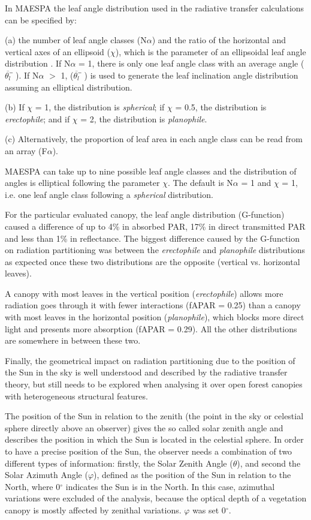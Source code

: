 \documentclass[a4paper,11pt]{report}
\begin{document}
In MAESPA the leaf angle distribution used in the radiative transfer calculations can be specified by:

(a) the number of leaf angle classes (N$\alpha$) and the ratio of the horizontal and vertical axes of an ellipsoid ($\chi$), which is the parameter of an ellipsoidal leaf angle distribution \citep{Campbell1990}. If N$\alpha$ = 1, there is only one leaf angle class with an average angle ($\overline{\theta_l}̅$). If N$\alpha$ $>$ 1, ($\overline{\theta_l}̅$) is used to generate the leaf inclination angle distribution assuming an elliptical distribution.

(b) If $\chi$ = 1, the distribution is \textit{spherical}; if $\chi$ = 0.5, the distribution is \textit{erectophile}; and if $\chi$ = 2, the distribution is \textit{planophile}. 

(c) Alternatively, the proportion of leaf area in each angle class can be read from an array (F$\alpha$). 

MAESPA can take up to nine possible leaf angle classes and the distribution of angles is elliptical following the parameter $\chi$. The default is N$\alpha$ = 1 and $\chi$ = 1, i.e. one leaf angle class following a \textit{spherical} distribution. 

For the particular evaluated canopy, the leaf angle distribution (G-function) caused a difference of up to 4\% in absorbed PAR, 17\% in direct transmitted PAR and less than 1\% in reflectance. The biggest difference caused by the G-function on radiation partitioning was between the \textit{erectophile} and \textit{planophile} distributions as expected once these two distributions are the opposite (vertical vs. horizontal leaves). 

A canopy with most leaves in the vertical position (\textit{erectophile}) allows more radiation goes through it with fewer interactions (fAPAR = 0.25) than a canopy with most leaves in the horizontal position (\textit{planophile}), which blocks more direct light and presents more absorption (fAPAR = 0.29). All the other distributions are somewhere in between these two. 

Finally, the geometrical impact on radiation partitioning due to the position of the Sun in the sky is well understood  and described by the radiative transfer theory, but still needs to be explored when analysing it over open forest canopies with heterogeneous structural features.

The position of the Sun in relation to the zenith (the point in the sky or celestial sphere directly above an observer) gives the so called solar zenith angle and describes the position in which the Sun is located in the celestial sphere. In order to have a precise position of the Sun, the observer needs a combination of two different types of information: firstly, the Solar Zenith Angle ($\theta$), and second the Solar Azimuth Angle ($\varphi$), defined as the position of the Sun in relation to the North, where 0$^{\circ}$ indicates the Sun is in the North. In this case, azimuthal variations were excluded of the analysis, because the optical depth of a vegetation canopy is mostly affected by zenithal variations. $\varphi$ was set 0$^{\circ}$. 
\end{document}

